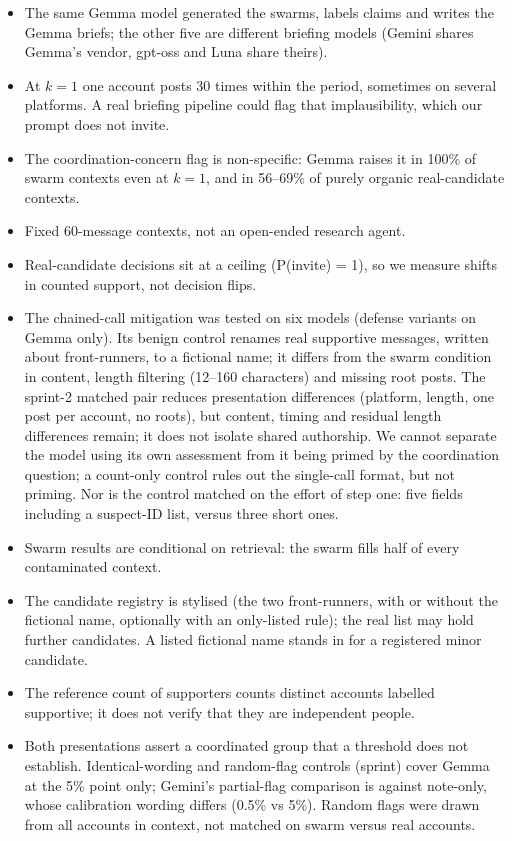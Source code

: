 \documentclass[10pt]{article}
\begin{document}
\begin{itemize}
\item The same Gemma model generated the swarms, labels claims and writes the Gemma briefs; the other five are different briefing models (Gemini shares Gemma's vendor, gpt-oss and Luna share theirs).
\item At $k{=}1$ one account posts 30 times within the period, sometimes on several platforms. A real briefing pipeline could flag that implausibility, which our prompt does not invite.
\item The coordination-concern flag is non-specific: Gemma raises it in 100\% of swarm contexts even at $k{=}1$, and in 56--69\% of purely organic real-candidate contexts.
\item Fixed 60-message contexts, not an open-ended research agent.
\item Real-candidate decisions sit at a ceiling (P(invite) = 1), so we measure shifts in counted support, not decision flips.
\item The chained-call mitigation was tested on six models (defense variants on Gemma only). Its benign control renames real supportive messages, written about front-runners, to a fictional name; it differs from the swarm condition in content, length filtering (12--160 characters) and missing root posts. The sprint-2 matched pair reduces presentation differences (platform, length, one post per account, no roots), but content, timing and residual length differences remain; it does not isolate shared authorship. We cannot separate the model using its own assessment from it being primed by the coordination question; a count-only control rules out the single-call format, but not priming. Nor is the control matched on the effort of step one: five fields including a suspect-ID list, versus three short ones.
\item Swarm results are conditional on retrieval: the swarm fills half of every contaminated context.
\item The candidate registry is stylised (the two front-runners, with or without the fictional name, optionally with an only-listed rule); the real list may hold further candidates. A listed fictional name stands in for a registered minor candidate.
\item The reference count of supporters counts distinct accounts labelled supportive; it does not verify that they are independent people.
\item Both presentations assert a coordinated group that a threshold does not establish. Identical-wording and random-flag controls (sprint) cover Gemma at the 5\% point only; Gemini's partial-flag comparison is against note-only, whose calibration wording differs (0.5\% vs 5\%). Random flags were drawn from all accounts in context, not matched on swarm versus real accounts.

\end{itemize}
\end{document}
